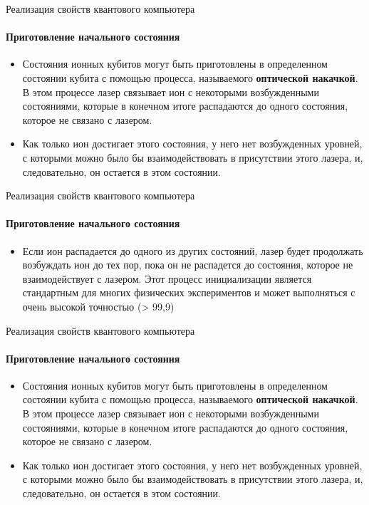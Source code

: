 \documentclass{beamer}
\begin{document}
    \begin{frame}{Реализация свойств квантового компьютера}
    \framesubtitle{Приготовление начального состояния}

    \begin{itemize}
            \item <1-> Состояния ионных кубитов могут быть приготовлены в определенном состоянии кубита с помощью процесса, называемого \textbf{оптической накачкой}. В этом процессе лазер связывает ион с некоторыми возбужденными состояниями, которые в конечном итоге распадаются до одного состояния, которое не связано с лазером.
            \item <2-> Как только ион достигает этого состояния, у него нет возбужденных уровней, с которыми можно было бы взаимодействовать в присутствии этого лазера, и, следовательно, он остается в этом состоянии.
    \end{itemize}


    \end{frame}

    \begin{frame}{Реализация свойств квантового компьютера}
    \framesubtitle{Приготовление начального состояния}

    \begin{itemize}
            \item <1-> Если ион распадается до одного из других состояний, лазер будет продолжать возбуждать ион до тех пор, пока он не распадется до состояния, которое не взаимодействует с лазером. Этот процесс инициализации является стандартным для многих физических экспериментов и может выполняться с очень высокой точностью (> 99,9)
    \end{itemize}

    \end{frame}

    \begin{frame}{Реализация свойств квантового компьютера}
    \framesubtitle{Приготовление начального состояния}

    \begin{itemize}
            \item <1-> Состояния ионных кубитов могут быть приготовлены в определенном состоянии кубита с помощью процесса, называемого \textbf{оптической накачкой}. В этом процессе лазер связывает ион с некоторыми возбужденными состояниями, которые в конечном итоге распадаются до одного состояния, которое не связано с лазером.
            \item <2-> Как только ион достигает этого состояния, у него нет возбужденных уровней, с которыми можно было бы взаимодействовать в присутствии этого лазера, и, следовательно, он остается в этом состоянии.
    \end{itemize}


    \end{frame}
\end{document}
